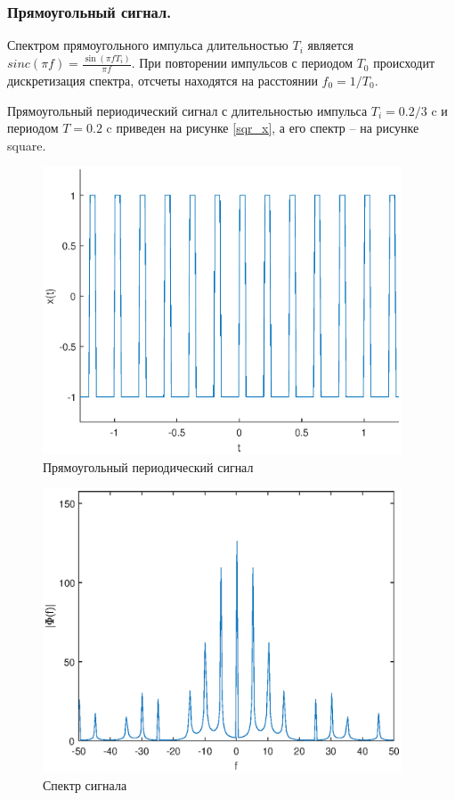 \documentclass[a4paper,14pt]{extarticle}
\begin{document}
\subsubsection{Прямоугольный сигнал.}
Спектром прямоугольного импульса длительностью $T_i$ является $sinc(\pi f)=\frac{\sin(\pi f T_i)}{\pi f}$. При повторении импульсов с периодом $T_0$ происходит дискретизация спектра, отсчеты находятся на расстоянии $f_0 = 1/T_0$. 

Прямоугольный периодический сигнал с длительностью импульса $T_i = 0.2/3$ c и периодом $T = 0.2$ c приведен на рисунке \ref{sqr_x}, а его спектр -- на рисунке square. 

\begin{figure}[H]
\centering
\includegraphics[width=0.95\textwidth]{square.eps}
\captionsetup{justification=centering,margin=0cm}
\caption{Прямоугольный периодический сигнал}
\label{square}
\end{figure}

\begin{figure}[H]
\centering
\includegraphics[width=0.95\textwidth]{square_fft.eps}
\captionsetup{justification=centering,margin=1cm}
\caption{Спектр сигнала}
\label{square_fft}
\end{figure}
\end{document}
